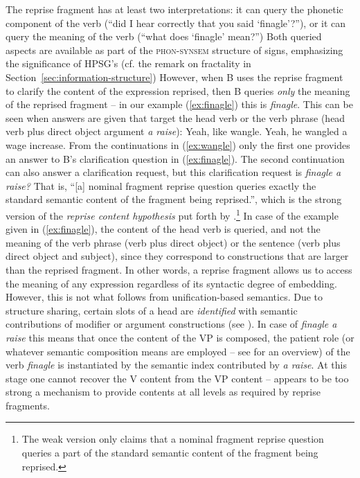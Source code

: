 \documentclass[output=paper]{langsci/langscibook}
\begin{document}
{The reprise fragment has at least two interpretations: it can query the phonetic component of the verb (\enquote{did I hear correctly that you said \enquote{finagle}?}), or it can query the meaning of the verb (\enquote{what does \enquote{finagle} mean?})
%
Both queried aspects are available as part of the \textsc{phon-synsem} structure of signs, emphasizing the significance of HPSG's   (cf. the remark on fractality in Section~\ref{sec:information-structure})
%
However, when B uses the reprise fragment to clarify the content of the expression reprised, then B queries \emph{only} the meaning of the reprised fragment \citep{Purver:Ginzburg:2004,Ginzburg:Purver:2012} -- in our example (\ref{ex:finagle}) this is \textit{finagle}.
%
This can be seen when answers are given that target the head verb or the verb phrase (head verb plus direct object argument \textit{a raise}):
%
\ea \label{ex:wangle}
 \ea Yeah, like wangle.
 \ex Yeah, he wangled a wage increase.
 \z 
\z
%
From the continuations in (\ref{ex:wangle}) only the first one provides an answer to B's clarification question in (\ref{ex:finagle}).
%
The second continuation can also answer a clarification request, but this clarification request is \textit{finagle a raise?}
%
That is, \enquote{[a] nominal fragment reprise question queries exactly the standard semantic content of the fragment being reprised.}, which is the strong version of the \emph{reprise content hypothesis}  put forth by \citet[]{Purver:Ginzburg:2004}.\footnote{The weak version \citep[]{Purver:Ginzburg:2004} only claims that a nominal fragment reprise question queries a part of the standard semantic content of the fragment being reprised.}
%
In case of the example given in (\ref{ex:finagle}), the content of the head verb is queried, and not the meaning of the verb phrase (verb plus direct object) or the sentence (verb plus direct object and subject), since they correspond to constructions that are larger than the reprised fragment. 
%
In other words, a reprise fragment allows us to access the meaning of any expression regardless of its syntactic degree of embedding. 
%
However, this is not what follows from unification-based semantics.
%
Due to structure sharing, certain slots of a head are \emph{identified} with semantic contributions of modifier or argument constructions (see  ).
%
In case of \textit{finagle a raise} this means that once the content of the VP is composed, the patient role (or whatever semantic composition means are employed -- see  for an overview) of the verb \textit{finagle} is instantiated by the semantic index contributed by \textit{a raise}.
%
At this stage one cannot recover the V content from the VP content --  appears to be too strong a mechanism to provide contents at all levels as required by reprise fragments. 
  



}
\end{document}

